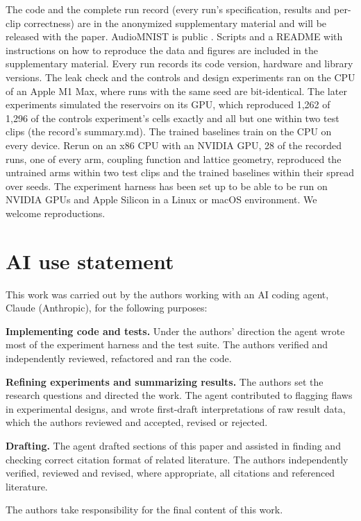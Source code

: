 \documentclass{article}
\makeatletter
\newcommand{\iclr@floatbarrier}{\par\vspace{\z@}%
  \ifx\@deferlist\@empty\else\clearpage\fi}
\let\iclr@section\section
\renewcommand{\section}{\iclr@floatbarrier\iclr@section}
\makeatother
\begin{document}
The code and the complete run record (every run's specification, results
and per-clip correctness) are in the anonymized supplementary material
and will be released with the paper. AudioMNIST is public
\citep{becker2024}. Scripts and a README with instructions on how to
reproduce the data and figures are included in the supplementary
material. Every run records its code version, hardware and library
versions. The leak check and the controls and design experiments ran on
the CPU of an Apple M1 Max, where runs with the same seed are
bit-identical. The later experiments simulated the reservoirs on its
GPU, which reproduced 1,262 of 1,296 of the controls experiment's cells
exactly and all but one within two test clips (the record's summary.md).
The trained baselines train on the CPU on every device. Rerun on an x86
CPU with an NVIDIA GPU, 28 of the recorded runs, one of every arm,
coupling function and lattice geometry, reproduced the untrained arms
within two test clips and the trained baselines within their spread over
seeds. The experiment harness has been set up to be able to be run on
NVIDIA GPUs and Apple Silicon in a Linux or macOS environment. We
welcome reproductions.

\section*{AI use statement}\label{ai-use-statement}

This work was carried out by the authors working with an AI coding
agent, Claude (Anthropic), for the following purposes:

\textbf{Implementing code and tests.} Under the authors' direction the
agent wrote most of the experiment harness and the test suite. The
authors verified and independently reviewed, refactored and ran the
code.

\textbf{Refining experiments and summarizing results.} The authors set
the research questions and directed the work. The agent contributed to
flagging flaws in experimental designs, and wrote first-draft
interpretations of raw result data, which the authors reviewed and
accepted, revised or rejected.

\textbf{Drafting.} The agent drafted sections of this paper and assisted
in finding and checking correct citation format of related literature.
The authors independently verified, reviewed and revised, where
appropriate, all citations and referenced literature.

The authors take responsibility for the final content of this work.
\end{document}

